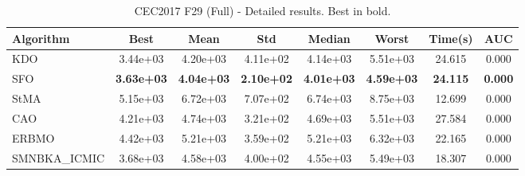\begin{table}[H]
\centering\small
\caption{CEC2017 F29 (Full) - Detailed results. Best in bold.}
\label{tab:cec2017_F29}
\begin{tabular}{lccccccc}
\toprule
\textbf{Algorithm} & \textbf{Best} & \textbf{Mean} & \textbf{Std} & \textbf{Median} & \textbf{Worst} & \textbf{Time(s)} & \textbf{AUC} \\
\midrule
KDO & 3.44e+03 & 4.20e+03 & 4.11e+02 & 4.14e+03 & 5.51e+03 & 24.615 & 0.000 \\
SFO & \textbf{3.63e+03} & \textbf{4.04e+03} & \textbf{2.10e+02} & \textbf{4.01e+03} & \textbf{4.59e+03} & \textbf{24.115} & \textbf{0.000} \\
StMA & 5.15e+03 & 6.72e+03 & 7.07e+02 & 6.74e+03 & 8.75e+03 & 12.699 & 0.000 \\
CAO & 4.21e+03 & 4.74e+03 & 3.21e+02 & 4.69e+03 & 5.51e+03 & 27.584 & 0.000 \\
ERBMO & 4.42e+03 & 5.21e+03 & 3.59e+02 & 5.21e+03 & 6.32e+03 & 22.165 & 0.000 \\
SMNBKA_ICMIC & 3.68e+03 & 4.58e+03 & 4.00e+02 & 4.55e+03 & 5.49e+03 & 18.307 & 0.000 \\
\bottomrule
\end{tabular}
\end{table}
